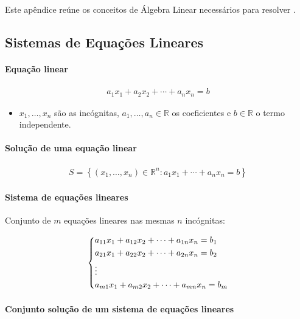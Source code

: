 \documentclass{article}
\begin{document}
Este apêndice reúne os conceitos de Álgebra Linear necessários para resolver
.

\subsection{Sistemas de Equações Lineares}

\paragraph{Equação linear}

\begin{gather*}
a_1 x_1 + a_2 x_2 + \cdots + a_n x_n = b
\end{gather*}

\begin{itemize}
    \item $x_1, \ldots, x_n$ são as incógnitas, $a_1, \ldots, a_n \in \mathbb{R}$ os coeficientes e
    $b \in \mathbb{R}$ o termo independente.
\end{itemize}

\paragraph{Solução de uma equação linear}

\begin{gather*}
S = \left\{ (x_1, \ldots, x_n) \in \mathbb{R}^n : a_1 x_1 + \cdots + a_n x_n = b \right\}
\end{gather*}

\paragraph{Sistema de equações lineares}

Conjunto de $m$ equações lineares nas mesmas $n$ incógnitas:

\begin{gather*}
\begin{dcases}
a_{11}x_1 + a_{12}x_2 + \cdots + a_{1n}x_n = b_1 \\
a_{21}x_1 + a_{22}x_2 + \cdots + a_{2n}x_n = b_2 \\
\vdots \\
a_{m1}x_1 + a_{m2}x_2 + \cdots + a_{mn}x_n = b_m
\end{dcases}
\end{gather*}

\paragraph{Conjunto solução de um sistema de equações lineares}
\end{document}
